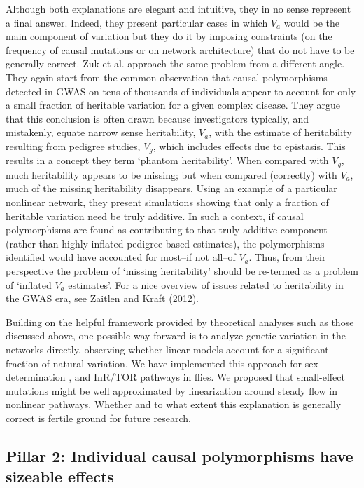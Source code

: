 Although both explanations are elegant and intuitive, they in no sense represent a final answer. Indeed, they present particular cases in which $V_a$ would be the main component of variation but they do it by imposing constraints (on the frequency of causal mutations or on network architecture) that do not have to be generally correct. Zuk et al. \cite{Zuk2012} approach the same problem from a different angle. They again start from the common observation that causal polymorphisms detected in GWAS on tens of thousands of individuals appear to account for only a small fraction of heritable variation for a given complex disease. They argue that this conclusion is often drawn because investigators typically, and mistakenly, equate narrow sense heritability, $V_a$, with the estimate of heritability resulting from pedigree studies, $V_g$, which includes effects due to epistasis. This results in a concept they term `phantom heritability'. When compared with $V_g$, much heritability appears to be missing; but when compared (correctly) with $V_a$, much of the missing heritability disappears. Using an example of a particular nonlinear network, they present simulations showing that only a fraction of heritable variation need be truly additive. In such a context, if causal polymorphisms are found as contributing to that truly additive component (rather than highly inflated pedigree-based estimates), the polymorphisms identified would have accounted for most–if not all–of $V_a$. Thus, from their perspective the problem of `missing heritability' should be re-termed as a problem of `inflated $V_a$ estimates'. For a nice overview of issues related to heritability in the GWAS era, see Zaitlen and Kraft (2012)\cite{Zaitlen2012}.

Building on the helpful framework provided by theoretical analyses such as those discussed above, one possible way forward is to analyze genetic variation in the networks directly, observing whether linear models account for a significant fraction of natural variation. We have implemented this approach for sex determination \cite{Tarone2005}, and InR/TOR \cite{Nuzhdin2009} pathways in flies. We proposed \cite{Tarone2012} that small-effect mutations might be well approximated by linearization around steady flow in nonlinear pathways. Whether and to what extent this explanation is generally correct is fertile ground for future research.

\subsection{Pillar 2: Individual causal polymorphisms have sizeable effects}


